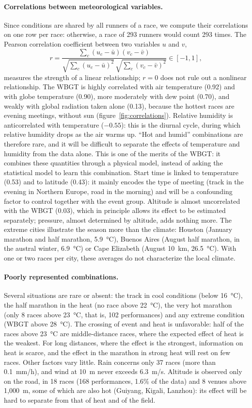 \documentclass[11pt,a4paper]{article}
\begin{document}
\paragraph{Correlations between meteorological variables.} Since conditions are shared by all runners of a race, we
compute their correlations on one row per race: otherwise, a race of 293 runners would count 293 times. The Pearson
correlation coefficient between two variables $u$ and $v$,
\[
r = \frac{\sum_c (u_c - \bar u)(v_c - \bar v)}{\sqrt{\sum_c (u_c - \bar u)^2}\,\sqrt{\sum_c (v_c - \bar v)^2}}
\in [-1, 1],
\]
measures the strength of a linear relationship; $r = 0$ does not rule out a nonlinear relationship. The WBGT is highly
correlated with air temperature (0.92) and with globe temperature (0.90), more moderately with dew point (0.70), and
weakly with global radiation taken alone (0.13), because the hottest races are evening meetings, without sun
(figure~\ref{fig:correlations}). Relative humidity is anticorrelated with temperature ($-0.55$): this is the diurnal
cycle, during which relative humidity drops as the air warms up. ``Hot and humid'' combinations are therefore rare,
and it will be difficult to separate the effects of temperature and humidity from the data alone. This is one of the
merits of the WBGT: it combines these quantities through a physical model, instead of asking the statistical model to
learn this combination. Start time is linked to temperature (0.53) and to latitude (0.43): it mainly encodes the type
of meeting (track in the evening in Northern Europe, road in the morning) and will be a confounding factor to control
together with the event group. Altitude is almost uncorrelated with the WBGT (0.03), which in principle allows its
effect to be estimated separately; pressure, almost determined by altitude, adds nothing more. The extreme cities
illustrate the season more than the climate: Houston (January marathon and half marathon, 5.9~°C), Buenos Aires
(August half marathon, in the austral winter, 6.9~°C) or Cape Elizabeth (August 10~km, 26.5~°C). With one or two races
per city, these averages do not characterize the local climate.

\paragraph{Poorly represented combinations.} Several situations are rare or absent: the track in cool conditions
(below 16~°C), the half marathon in the heat (no race above 22~°C), the very hot marathon (only 8 races above 23~°C,
that is, 102 performances) and any extreme condition (WBGT above 28~°C). The crossing of event and heat is
unfavorable: half of the races above 23~°C are middle-distance races, where the expected effect of heat is the
weakest. For long distances, where the effect is the strongest, information on heat is scarce, and the effect in the
marathon in strong heat will rest on few races. Other factors vary little. Rain concerns only 37 races (more than
0.1~mm/h), and wind at 10~m never exceeds 6.3~m/s. Altitude is observed only on the road, in 18 races (168
performances, 1.6\% of the data) and 8 venues above 1,000~m, some of which are also hot (Guiyang, Kigali, Lanzhou): its
effect will be hard to separate from that of heat and of the field.
\end{document}
